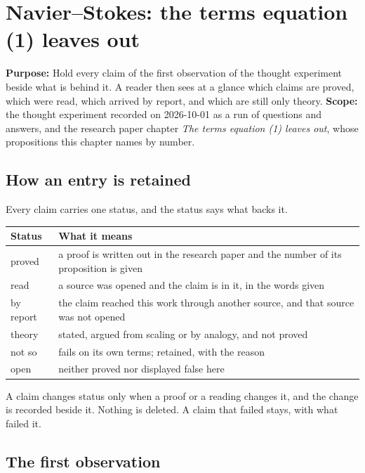 \chapter{Navier--Stokes: the terms equation (1) leaves out}

\textbf{Purpose:} Hold every claim of the first observation of the thought experiment beside what
is behind it. A reader then sees at a glance which claims are proved, which were read, which
arrived by report, and which are still only theory. \textbf{Scope:} the thought experiment recorded
on 2026-10-01 as a run of questions and answers, and the research paper chapter \emph{The terms
equation (1) leaves out}, whose propositions this chapter names by number.

\section{How an entry is retained}

Every claim carries one status, and the status says what backs it.

\begin{center}
\begin{tabular}{@{}p{}>{\raggedright\arraybackslash}p{}@{}}
\toprule
Status & What it means \\
\midrule
proved & a proof is written out in the research paper and the number of its proposition is given \\
read & a source was opened and the claim is in it, in the words given \\
by report & the claim reached this work through another source, and that source was not opened \\
theory & stated, argued from scaling or by analogy, and not proved \\
not so & fails on its own terms; retained, with the reason \\
open & neither proved nor displayed false here \\
\bottomrule
\end{tabular}
\end{center}

A claim changes status only when a proof or a reading changes it, and the change is recorded
beside it. Nothing is deleted. A claim that failed stays, with what failed it.

\section{The first observation}

